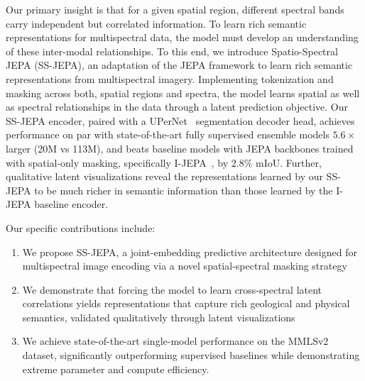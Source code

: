 
Our primary insight is that for a given spatial region, different spectral bands carry independent but correlated information. To learn rich semantic representations for multispectral data, the model must develop an understanding of these inter-modal relationships. To this end, we introduce Spatio-Spectral JEPA (SS-JEPA), an adaptation of the JEPA framework to learn rich semantic representations from multispectral imagery. Implementing tokenization and masking across both, spatial regions and spectra, the model learns spatial as well as spectral relationships in the data through a latent prediction objective. Our SS-JEPA encoder, paired with a UPerNet~\cite{DBLP:journals/corr/abs-1807-10221} segmentation decoder head, achieves performance on par with state-of-the-art fully supervised ensemble models \( 5.6\times \) larger (20M vs 113M), and beats baseline models with JEPA backbones trained with spatial-only masking, specifically I-JEPA~\cite{assran2023selfsupervisedlearningimagesjointembedding}, by \( 2.8\% \) mIoU. Further, qualitative latent visualizations reveal the representations learned by our SS-JEPA to be much richer in semantic information than those learned by the I-JEPA baseline encoder.

Our specific contributions include:
\vspace{-0.75em}
\begin{enumerate}[noitemsep,label=\roman*)]
	\item We propose SS-JEPA, a joint-embedding predictive architecture designed for multispectral image encoding via a novel spatial-spectral masking strategy
	\item We demonstrate that forcing the model to learn cross-spectral latent correlations yields representations that capture rich geological and physical semantics, validated qualitatively through latent visualizations
	\item We achieve state-of-the-art single-model performance on the MMLSv2 dataset, significantly outperforming supervised baselines while demonstrating extreme parameter and compute efficiency.
\end{enumerate}

